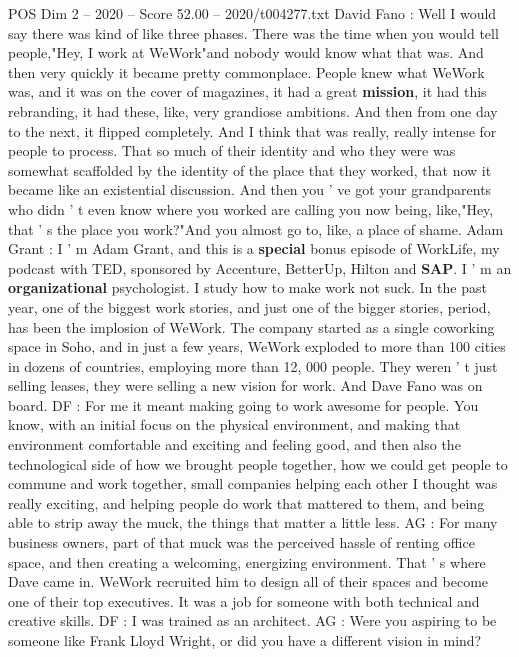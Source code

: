 \begin{textsample}{POS Dim 2 – 2020 – Score 52.00 – 2020/t004277.txt}  \label{ex:f2_pos_002}
David Fano : Well I would say there was kind of like three phases.
There was the time when you would tell people,"Hey, I work at WeWork"and nobody would know what that was.
And then very quickly it became pretty commonplace.
People knew what WeWork was, and it was on the cover of magazines, it had a great \textbf{mission}, it had this rebranding, it had these, like, very grandiose ambitions.
And then from one day to the next, it flipped completely.
And I think that was really, really intense for people to process.
That so much of their identity and who they were was somewhat scaffolded by the identity of the place that they worked, that now it became like an existential discussion.
And then you ' ve got your grandparents who didn ' t even know where you worked are calling you now being, like,"Hey, that ' s the place you work?"And you almost go to, like, a place of shame.
Adam Grant : I ' m Adam Grant, and this is a \textbf{special} bonus episode of WorkLife, my podcast with TED, sponsored by Accenture, BetterUp, Hilton and \textbf{SAP}.
I ' m an \textbf{organizational} psychologist.
I study how to make work not suck.
In the past year, one of the biggest work stories, and just one of the bigger stories, period, has been the implosion of WeWork.
The company started as a single coworking space in Soho, and in just a few years, WeWork exploded to more than 100 cities in dozens of countries, employing more than 12, 000 people.
They weren ' t just selling leases, they were selling a new vision for work.
And Dave Fano was on board.
DF : For me it meant making going to work awesome for people.
You know, with an initial focus on the physical environment, and making that environment comfortable and exciting and feeling good, and then also the technological side of how we brought people together, how we could get people to commune and work together, small companies helping each other I thought was really exciting, and helping people do work that mattered to them, and being able to strip away the muck, the things that matter a little less.
AG : For many business owners, part of that muck was the perceived hassle of renting office space, and then creating a welcoming, energizing environment.
That ' s where Dave came in.
WeWork recruited him to design all of their spaces and become one of their top executives.
It was a job for someone with both technical and creative skills.
DF : I was trained as an architect.
AG : Were you aspiring to be someone like Frank Lloyd Wright, or did you have a different vision in mind?

\end{textsample}
